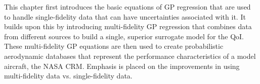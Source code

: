 This chapter first introduces the basic equations of GP regression that are used to handle single-fidelity data that can have uncertainties associated with it.
It builds upon this by introducing multi-fidelity GP regression that combines data from different sources to build a single, superior surrogate model for the QoI.
These multi-fidelity GP equations are then used to create probabilistic aerodynamic databases that represent the performance characteristics of a model aircraft, the NASA CRM. 
Emphasis is placed on the improvements in using multi-fidelity data vs. single-fidelity data. 
